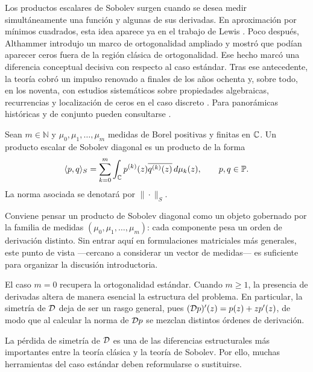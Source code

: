 Los productos escalares de Sobolev surgen cuando se desea medir simultáneamente
una función y algunas de sus derivadas. En aproximación por mínimos cuadrados,
esta idea aparece ya en el trabajo de Lewis \cite{Lew47}. Poco después,
Althammer \cite{Alt62} introdujo un marco de ortogonalidad ampliado y mostró
que podían aparecer ceros fuera de la región clásica de ortogonalidad. Ese hecho
marcó una diferencia conceptual decisiva con respecto al caso estándar. Tras
ese antecedente, la teoría cobró un impulso renovado a finales de los años
ochenta y, sobre todo, en los noventa, con estudios sistemáticos sobre
propiedades algebraicas, recurrencias y localización de ceros en el caso
discreto \cite{AMRR92,AMR93,ALR96}. Para panorámicas históricas y de conjunto
pueden consultarse \cite{AlfRez01,marcellan2015sobolev}.

\begin{defn}\label{def:producto_sobolev_general}
	Sean \(m\in\mathbb N\) y \(\mu_0,\mu_1,\dots,\mu_m\) medidas de Borel positivas y
	finitas en \(\mathbb{C}\). Un producto escalar de Sobolev diagonal es un producto de la
	forma
	\[
		\langle p,q\rangle_S
		=
		\sum_{k=0}^m \int_{\mathbb{C}} p^{(k)}(z)\overline{q^{(k)}(z)}\,d\mu_k(z),
		\qquad p,q\in\mathbb{P}.
	\]
	La norma asociada se denotará por \(\|\cdot\|_S\).
\end{defn}

\begin{rmk}\label{rmk:familia_medidas_intro}
	Conviene pensar un producto de Sobolev diagonal como un objeto gobernado por la
	familia de medidas \((\mu_0,\mu_1,\dots,\mu_m)\): cada componente pesa un
	orden de derivación distinto. Sin entrar aquí en formulaciones matriciales más
	generales, este punto de vista ---cercano a considerar un vector de medidas---
	es suficiente para organizar la discusión introductoria.
\end{rmk}

El caso \(m=0\) recupera la ortogonalidad estándar. Cuando \(m\ge 1\), la
presencia de derivadas altera de manera esencial la estructura del problema. En
particular, la simetría de \(\mathcal{D}\) deja de ser un rasgo general, pues
\((\mathcal{D} p)'(z)=p(z)+zp'(z)\),
de modo que al calcular la norma de \(\mathcal{D} p\) se mezclan distintos órdenes de
derivación.

\begin{rmk}\label{rmk:ruptura_simetria_sobolev}
	La pérdida de simetría de \(\mathcal{D}\) es una de las diferencias estructurales más
	importantes entre la teoría clásica y la teoría de Sobolev. Por ello, muchas
	herramientas del caso estándar deben reformularse o sustituirse.
\end{rmk}

